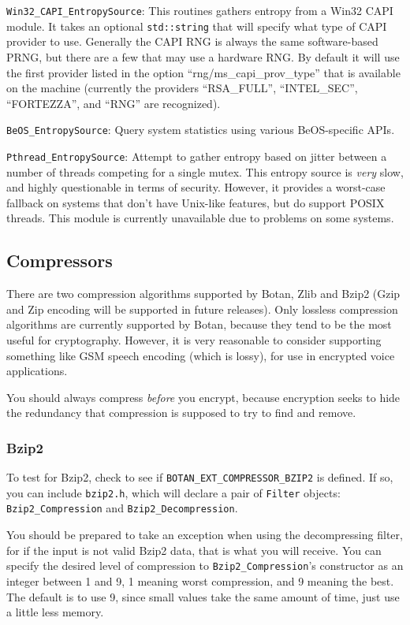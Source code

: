\documentclass{article}
\newcommand{\filename}[1]{\texttt{#1}}
\newcommand{\macro}[1]{\texttt{#1}}
\newcommand{\type}[1]{\texttt{#1}}
\begin{document}
\noindent
\type{Win32\_CAPI\_EntropySource}: This routines gathers entropy from a Win32
CAPI module. It takes an optional \type{std::string} that will specify what
type of CAPI provider to use. Generally the CAPI RNG is always the same
software-based PRNG, but there are a few that may use a hardware RNG. By
default it will use the first provider listed in the option
``rng/ms\_capi\_prov\_type'' that is available on the machine (currently the
providers ``RSA\_FULL'', ``INTEL\_SEC'', ``FORTEZZA'', and ``RNG'' are
recognized).

\noindent
\type{BeOS\_EntropySource}: Query system statistics using various BeOS-specific
APIs.

\noindent
\type{Pthread\_EntropySource}: Attempt to gather entropy based on jitter
between a number of threads competing for a single mutex. This entropy source
is \emph{very} slow, and highly questionable in terms of security. However, it
provides a worst-case fallback on systems that don't have Unix-like features,
but do support POSIX threads. This module is currently unavailable due to
problems on some systems.

\subsection{Compressors}

There are two compression algorithms supported by Botan, Zlib and Bzip2 (Gzip
and Zip encoding will be supported in future releases). Only lossless
compression algorithms are currently supported by Botan, because they tend to
be the most useful for cryptography. However, it is very reasonable to consider
supporting something like GSM speech encoding (which is lossy), for use in
encrypted voice applications.

You should always compress \emph{before} you encrypt, because encryption seeks
to hide the redundancy that compression is supposed to try to find and remove.

\subsubsection{Bzip2}

To test for Bzip2, check to see if \macro{BOTAN\_EXT\_COMPRESSOR\_BZIP2} is
defined. If so, you can include \filename{bzip2.h}, which will declare a pair
of \type{Filter} objects: \type{Bzip2\_Compression} and
\type{Bzip2\_Decompression}.

You should be prepared to take an exception when using the decompressing
filter, for if the input is not valid Bzip2 data, that is what you will
receive. You can specify the desired level of compression to
\type{Bzip2\_Compression}'s constructor as an integer between 1 and 9, 1
meaning worst compression, and 9 meaning the best. The default is to use 9,
since small values take the same amount of time, just use a little less memory.
\end{document}
